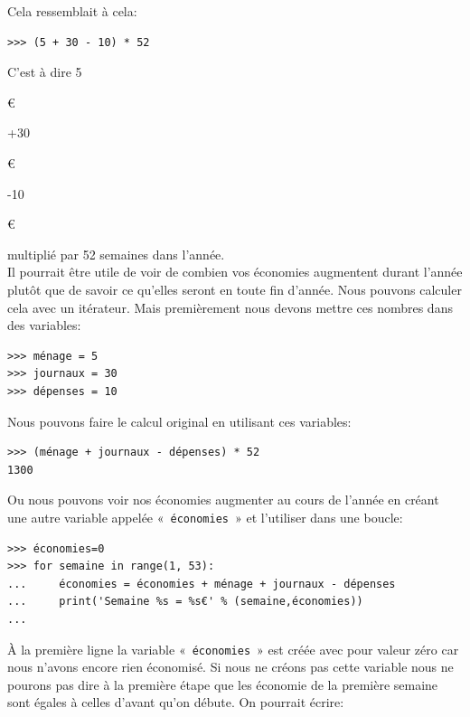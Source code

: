Cela ressemblait à cela:

\begin{Verbatim}[frame=single,rulecolor=\color{gray}, label=ne pas saisir]
>>> (5 + 30 - 10) * 52
\end{Verbatim}

C'est à dire 5\begin{small}\euro\end{small}+30\begin{small}\euro\end{small}-10\begin{small}\euro\end{small} multiplié par 52 semaines dans l'année.\\

Il pourrait être utile de voir de combien vos économies augmentent durant l'année plutôt que de savoir ce qu'elles seront en toute fin d'année. Nous pouvons calculer cela avec un itérateur. Mais premièrement nous devons mettre ces nombres dans des variables:

\begin{Verbatim}[frame=single,rulecolor=\color{mbleu}, label=à taper]
>>> ménage = 5
>>> journaux = 30
>>> dépenses = 10
\end{Verbatim}

Nous pouvons faire le calcul original en utilisant ces variables:

\begin{Verbatim}[frame=single,rulecolor=\color{mbleu}, label=à taper]
>>> (ménage + journaux - dépenses) * 52
1300
\end{Verbatim}

Ou nous pouvons voir nos économies augmenter au cours de l'année en créant une autre variable appelée « \texttt{économies} » et l'utiliser dans une boucle:

\begin{Verbatim}[frame=single,rulecolor=\color{mbleu}, label=à taper]
>>> économies=0
>>> for semaine in range(1, 53):
...     économies = économies + ménage + journaux - dépenses
...     print('Semaine %s = %s€' % (semaine,économies))
... 
\end{Verbatim}

À la première ligne la variable « \texttt{économies} » est créée avec pour valeur zéro car nous n'avons encore
rien économisé. Si nous ne créons pas cette variable nous ne pourons pas dire à la première étape que les économie de la première semaine sont égales à celles d'avant qu'on débute. On pourrait écrire:

